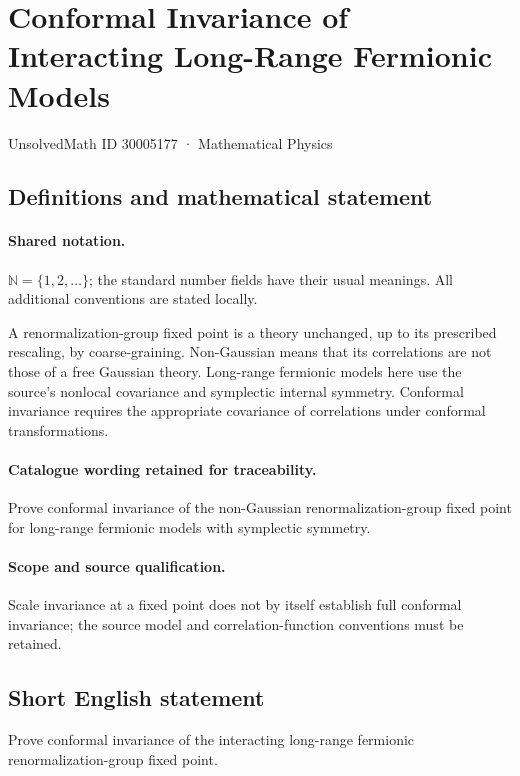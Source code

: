 \documentclass[11pt]{article}
\begin{document}
\setcounter{section}{30005176}
\section{Conformal Invariance of Interacting Long-Range Fermionic Models}\label{30005177}
{\small UnsolvedMath ID 30005177 · Mathematical Physics}
\subsection{Definitions and mathematical statement}

\paragraph{Shared notation.}$\mathbb N=\{1,2,\ldots\}$; the standard number fields have their usual meanings. All additional conventions are stated locally.


A renormalization-group fixed point is a theory unchanged, up to its prescribed rescaling, by coarse-graining. Non-Gaussian means that its correlations are not those of a free Gaussian theory. Long-range fermionic models here use the source's nonlocal covariance and symplectic internal symmetry. Conformal invariance requires the appropriate covariance of correlations under conformal transformations.

\paragraph{Catalogue wording retained for traceability.}
Prove conformal invariance of the non-Gaussian renormalization-group fixed point for long-range fermionic models with symplectic symmetry.

\paragraph{Scope and source qualification.}Scale invariance at a fixed point does not by itself establish full conformal invariance; the source model and correlation-function conventions must be retained.
\subsection{Short English statement}
Prove conformal invariance of the interacting long-range fermionic renormalization-group fixed point.
\end{document}
